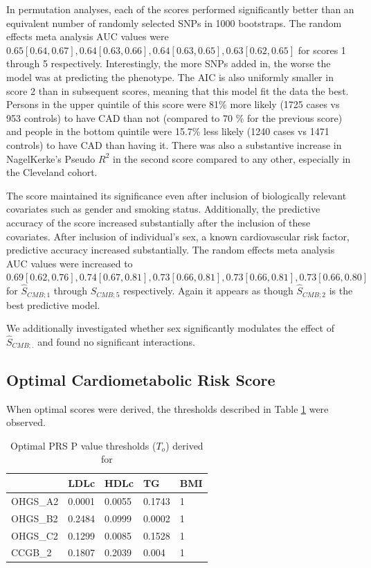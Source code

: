 In permutation analyses, each of the scores performed significantly better than an equivalent number of randomly selected \acp{SNP} in 1000 bootstraps. The random effects meta analysis \ac{AUC} values were $0.65 [ 0.64, 0.67], 0.64[0.63, 0.66], 0.64[0.63, 0.65], 0.63[0.62, 0.65]$ for scores 1 through 5 respectively. Interestingly, the more \acp{SNP} added in, the worse the model was at predicting the phenotype. The \ac{AIC} is also uniformly smaller in score 2 than in subsequent scores, meaning that this model fit the data the best. Persons in the upper quintile of this score were 81\% more likely (1725 cases vs 953 controls) to have \ac{CAD} than not (compared to 70 \% for the previous score) and people in the bottom quintile were 15.7\% less likely (1240 cases vs 1471 controls) to have \ac{CAD} than having it. There was also a substantive increase in NagelKerke's Pseudo $R^2$ in the second score compared to any other, especially in the Cleveland cohort. 

The score maintained its significance even after inclusion of biologically relevant covariates such as gender and smoking status. Additionally, the predictive accuracy of the score increased substantially after the inclusion of these covariates. After inclusion of individual's sex, a known cardiovascular risk factor, predictive accuracy increased substantially. The random effects meta analysis \ac{AUC} values were increased to $0.69[0.62, 0.76], 0.74[0.67, 0.81], 0.73 [0.66, 0.81], 0.73[0.66, 0.81], 0.73[0.66, 0.80]$ for $\hat{S}_{CMB; 1}$ through $\hat{S}_{CMB; 5}$ respectively. Again it appears as though $\hat{S}_{CMB; 2}$ is the best predictive model.


We additionally investigated whether sex significantly modulates the effect of  $\hat{S}_{CMB; .}$ and found no significant interactions. 

\subsection{Optimal Cardiometabolic Risk Score}

When optimal scores were derived, the thresholds described in Table \ref{oprs} were observed.

\begin{table}[H]
\centering
\caption{Optimal \ac{PRS} P value thresholds ($T_o$) derived for }
\label{oprs}
\begin{tabular}{lllll}
\hline
                  & \textbf{LDLc} & \textbf{HDLc} & \textbf{TG} & \textbf{BMI} \\ \hline
OHGS\_A2 & 0.0001        & 0.0055        & 0.1743      & 1            \\
OHGS\_B2 & 0.2484        & 0.0999        & 0.0002      & 1            \\
OHGS\_C2 & 0.1299        & 0.0085        & 0.1528      & 1            \\
CCGB\_2  & 0.1807        & 0.2039        & 0.004       & 1            \\ \hline
\end{tabular}
\end{table}


